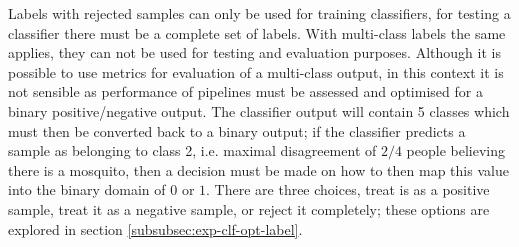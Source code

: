         
        Labels with rejected samples can only be used for training classifiers, for testing a classifier there must be a complete set of labels. With multi-class labels the same applies, they can not be used for testing and evaluation purposes. Although it is possible to use metrics for evaluation of a multi-class output, in this context it is not sensible as performance of pipelines must be assessed and optimised for a binary positive/negative output. The classifier output will contain 5 classes which must then be converted back to a binary output; if the classifier predicts a sample as belonging to class 2, i.e. maximal disagreement of $2/4$ people believing there is a mosquito, then a decision must be made on how to then map this value into the binary domain of $0$ or $1$. There are three choices, treat is as a positive sample, treat it as a negative sample, or reject it completely; these options are explored in section \ref{subsubsec:exp-clf-opt-label}. 
        
